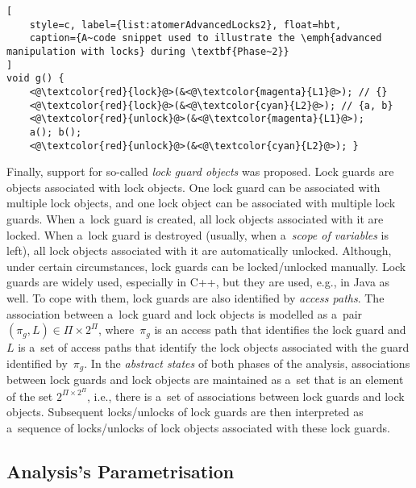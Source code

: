 \documentclass{ExcelAtFIT}
\theoremstyle{definition}
\begin{document}
\begin{lstlisting}[
    style=c, label={list:atomerAdvancedLocks2}, float=hbt,
    caption={A~code snippet used to illustrate the \emph{advanced manipulation with locks} during \textbf{Phase~2}}
]
void g() {
    <@\textcolor{red}{lock}@>(&<@\textcolor{magenta}{L1}@>); // {}
    <@\textcolor{red}{lock}@>(&<@\textcolor{cyan}{L2}@>); // {a, b}
    <@\textcolor{red}{unlock}@>(&<@\textcolor{magenta}{L1}@>);
    a(); b();
    <@\textcolor{red}{unlock}@>(&<@\textcolor{cyan}{L2}@>); }
\end{lstlisting}

Finally, support for so-called \emph{lock guard objects} was proposed. Lock guards are objects associated with lock objects. One lock guard can be associated with multiple lock objects, and one lock object can be associated with multiple lock guards. When a~lock guard is created, all lock objects associated with it are locked. When a~lock guard is destroyed (usually, when a~\emph{scope of variables} is left), all lock objects associated with it are automatically unlocked. Although, under certain circumstances, lock guards can be locked/unlocked manually. Lock guards are widely used, especially in C++, but they are used, e.g., in Java as well. To cope with them, lock guards are also identified by \emph{access paths}. The association between a~lock guard and lock objects is modelled as a~pair $ {(\pi_g, L)} \in \Pi \times 2^\Pi $, where~$ \pi_g $ is an access path that identifies the lock guard and~$ L $ is a~set of access paths that identify the lock objects associated with the guard identified by~$ \pi_g $. In the \emph{abstract states} of both phases of the analysis, associations between lock guards and lock objects are maintained as a~set that is an element of the set $ 2^{\Pi \times 2^\Pi} $, i.e., there is a~set of associations between lock guards and lock objects. Subsequent locks/unlocks of lock guards are then interpreted as a~sequence of locks/unlocks of lock objects associated with these lock guards. 

\subsection{Analysis's Parametrisation}
\end{document}
